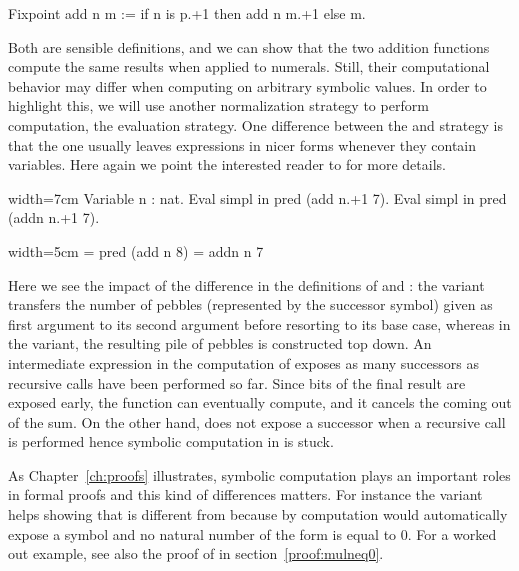 \begin{coq}{}{}
Fixpoint add n m := if n is p.+1 then add n m.+1 else m.
\end{coq}

Both are sensible definitions, and we can show that the two addition
functions compute the same results when applied to numerals.  Still,
their computational behavior may differ when computing on arbitrary
symbolic values. In order to highlight this, we will use another
normalization strategy to perform computation, the 
evaluation strategy.  One difference between the 
and  strategy is that the  one usually leaves
expressions in nicer forms whenever they contain variables. Here again
we point the interested reader to \cite[section 8.7.1]{Coq:manual} for
more details.

\begin{coq}{}{width=7cm}
Variable n : nat.
Eval simpl in pred (add  n.+1 7).
Eval simpl in pred (addn n.+1 7).
\end{coq}
\begin{coqout}{}{width=5cm}
= pred (add n 8)
= addn n 7
\end{coqout}

Here we see the impact of the difference in the definitions of
 and : the  variant transfers the
number of pebbles (represented by the successor  symbol)
given as first argument to its second argument
before resorting to its base case, whereas in the  variant,
the resulting pile of pebbles is constructed top down. An intermediate
expression in the computation of  exposes as many
successors as recursive calls have been performed so far. Since bits
of the final result are exposed early, the  function can
eventually compute, and it cancels the  coming out of the sum.
On the other hand,
 does not expose a successor when a recursive call is
performed hence symbolic computation in  is stuck.

As Chapter~\ref{ch:proofs} illustrates, symbolic computation plays an
important roles in formal proofs and this kind of differences
matters. For instance the  variant helps
showing that  is different from  because by
computation \Coq{} would automatically expose  a  symbol
and no natural number of the form  is equal to 0.
For a worked out example, see also the proof of  in
section~\ref{proof:mulneq0}.


